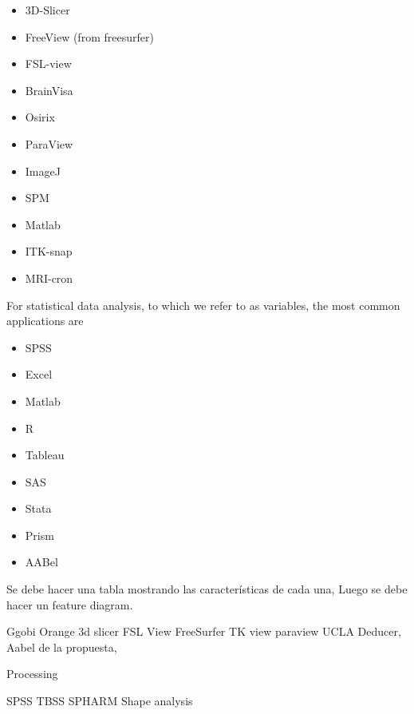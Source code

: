 \begin{itemize}
	\item 3D-Slicer
	\item FreeView (from freesurfer)
	\item FSL-view
	\item BrainVisa
	\item Osirix
	\item ParaView
	\item ImageJ
	\item SPM
	\item Matlab
	\item ITK-snap
	\item MRI-cron
\end{itemize}

For statistical data analysis, to which we refer to as variables, the most common applications are
\begin{itemize}
	\item SPSS
	\item Excel
	\item Matlab
	\item R
	\item Tableau
	\item SAS
	\item Stata
	\item Prism
	\item AABel
\end{itemize}

Se debe hacer una tabla mostrando las características de cada una,
Luego se debe hacer un feature diagram.

Ggobi
Orange
3d slicer
FSL View
FreeSurfer TK view
paraview
UCLA
Deducer, Aabel
de la propuesta, 

Processing

SPSS
TBSS
SPHARM
Shape analysis


